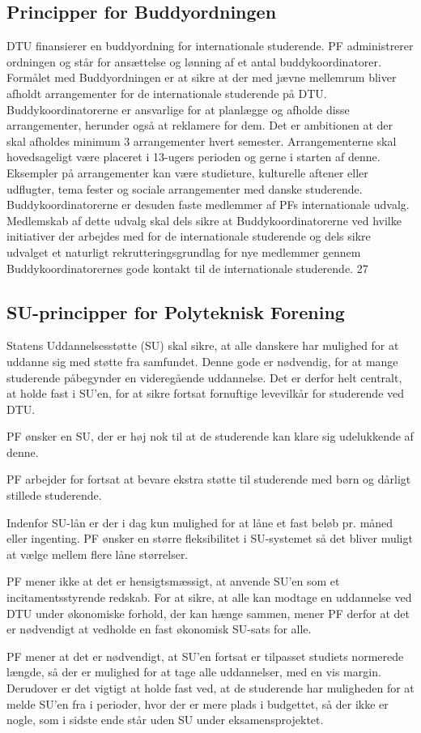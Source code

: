 \subsection{Principper for Buddyordningen}
DTU finansierer en buddyordning for internationale studerende. PF administrerer ordningen og står for ansættelse og
lønning af et antal buddykoordinatorer. Formålet med Buddyordningen er at sikre at der med jævne mellemrum bliver
afholdt arrangementer for de internationale studerende på DTU. Buddykoordinatorerne er ansvarlige for at planlægge
og afholde disse arrangementer, herunder også at reklamere for dem.
Det er ambitionen at der skal afholdes minimum 3 arrangementer hvert semester. Arrangementerne skal hovedsageligt
være placeret i 13-ugers perioden og gerne i starten af denne. Eksempler på arrangementer kan være studieture,
kulturelle aftener eller udflugter, tema fester og sociale arrangementer med danske studerende.
Buddykoordinatorerne er desuden faste medlemmer af PFs internationale udvalg. Medlemskab af dette udvalg skal dels
sikre at Buddykoordinatorerne ved hvilke initiativer der arbejdes med for de internationale studerende og dels sikre
udvalget et naturligt rekrutteringsgrundlag for nye medlemmer gennem Buddykoordinatorernes gode kontakt til de
internationale studerende.
27
\subsection{SU-principper for Polyteknisk Forening}
Statens Uddannelsesstøtte (SU) skal sikre, at alle danskere har mulighed for at uddanne sig med støtte fra samfundet.
Denne gode er nødvendig, for at mange studerende påbegynder en videregående uddannelse. Det er derfor helt centralt,
at holde fast i SU’en, for at sikre fortsat fornuftige levevilkår for studerende ved DTU.
\begin{list}{•}
\item PF ønsker en SU, der er høj nok til at de studerende kan klare sig udelukkende af denne.
\item PF arbejder for fortsat at bevare ekstra støtte til studerende med børn og dårligt stillede studerende.
\item Indenfor SU-lån er der i dag kun mulighed for at låne et fast beløb pr. måned eller ingenting. PF ønsker en større fleksibilitet i SU-systemet så det bliver muligt at vælge mellem flere låne størrelser.
\item PF mener ikke at det er hensigtsmæssigt, at anvende SU’en som et incitamentsstyrende redskab. For at sikre, at alle kan modtage en uddannelse ved DTU under økonomiske forhold, der kan hænge sammen, mener PF derfor at det er nødvendigt at vedholde en fast økonomisk SU-sats for alle.
\item PF mener at det er nødvendigt, at SU’en fortsat er tilpasset studiets normerede længde, så der er mulighed for at tage alle uddannelser, med en vis margin. Derudover er det vigtigt at holde fast ved, at de studerende har muligheden for at melde SU’en fra i perioder, hvor der er mere plads i budgettet, så der ikke er nogle, som i sidste ende står uden SU under eksamensprojektet.
\end{list}

